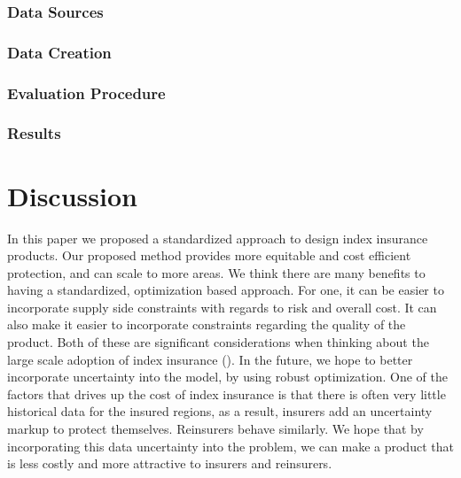 \documentclass[11pt]{article}
\begin{document}
    \subsubsection{Data Sources}
    
    \subsubsection{Data Creation}

    \subsubsection{Evaluation Procedure}

    \subsubsection{Results}

\section{Discussion}
  In this paper we proposed a standardized approach to design index insurance products. Our proposed method provides more equitable and cost efficient protection, and can scale to more areas. We think there are many benefits to having a standardized, optimization based approach. For one, it can be easier to incorporate supply side constraints with regards to risk and overall cost. It can also make it easier to incorporate constraints regarding the quality of the product. Both of these are significant considerations when thinking about the large scale adoption of index insurance (\cite{jensen2017agricultural}). In the future, we hope to better incorporate uncertainty into the model, by using robust optimization. One of the factors that drives up the cost of index insurance is that there is often very little historical data for the insured regions, as a result, insurers add an uncertainty markup to protect themselves. Reinsurers behave similarly. We hope that by incorporating this data uncertainty into the problem, we can make a product that is less costly and more attractive to insurers and reinsurers. 

\printbibliography
\end{document}
